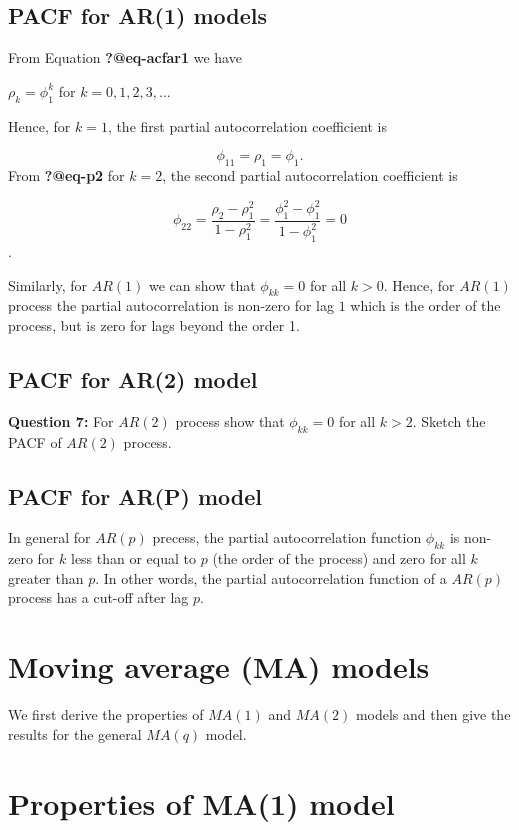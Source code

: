 \documentclass[
  11pt,
  a4paper,
]{report}
\begin{document}
\subsection{PACF for AR(1) models}\label{pacf-for-ar1-models}

From Equation \textbf{?@eq-acfar1} we have

\(\rho_k=\phi_1^k\) for \(k=0, 1, 2, 3,...\)

Hence, for \(k=1\), the first partial autocorrelation coefficient is

\[\phi_{11}=\rho_1=\phi_1.\] From \textbf{?@eq-p2} for \(k=2\), the
second partial autocorrelation coefficient is

\[\phi_{22}=\frac{\rho_2-\rho_1^2}{1-\rho_1^2}=\frac{\phi_1^2-\phi_1^2}{1-\phi_1^2} = 0\].

Similarly, for \(AR(1)\) we can show that \(\phi_{kk}=0\) for all
\(k > 0\). Hence, for \(AR(1)\) process the partial autocorrelation is
non-zero for lag \(1\) which is the order of the process, but is zero
for lags beyond the order 1.

\subsection{PACF for AR(2) model}\label{pacf-for-ar2-model}

\textbf{Question 7:} For \(AR(2)\) process show that \(\phi_{kk}=0\) for
all \(k>2\). Sketch the PACF of \(AR(2)\) process.

\subsection{PACF for AR(P) model}\label{pacf-for-arp-model}

In general for \(AR(p)\) precess, the partial autocorrelation function
\(\phi_{kk}\) is non-zero for \(k\) less than or equal to \(p\) (the
order of the process) and zero for all \(k\) greater than \(p\). In
other words, the partial autocorrelation function of a \(AR(p)\) process
has a cut-off after lag \(p\).

\section{Moving average (MA) models}\label{moving-average-ma-models}

We first derive the properties of \(MA(1)\) and \(MA(2)\) models and
then give the results for the general \(MA(q)\) model.

\section{Properties of MA(1) model}\label{properties-of-ma1-model}
\end{document}
